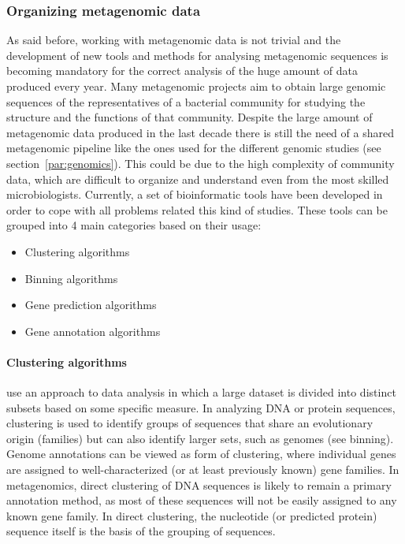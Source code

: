 \subsubsection*{Organizing metagenomic data}
As said before, working with metagenomic data is not trivial and the development of new tools and methods for analysing metagenomic sequences is becoming mandatory for the correct analysis of the huge amount of data produced every year. Many metagenomic projects aim to obtain large genomic sequences of the representatives of a bacterial community for studying the structure and the functions of that community. Despite the large amount of metagenomic data produced in the last decade there is still the need of a shared metagenomic pipeline like the ones used for the different genomic studies (see section~\ref{par:genomics}). This could be due to the high complexity of community data, which are difficult to organize and understand even from the most skilled microbiologists. Currently, a set of bioinformatic tools have been developed in order to cope with all problems related this kind of studies. These tools can be grouped into 4 main categories based on their usage:
\vspace{-3mm}
\begin{itemize}[nosep]
\item Clustering algorithms
\item Binning algorithms
\item Gene prediction algorithms
\item Gene annotation algorithms
\end{itemize}

\paragraph{Clustering algorithms} use an approach to data analysis in which a large dataset is divided into distinct subsets based on some specific measure. In analyzing DNA or protein sequences, clustering is used to identify groups of sequences that share an evolutionary origin (families) but can also identify larger sets, such as genomes (see binning). Genome annotations can be viewed as form of clustering, where individual genes are assigned to well-characterized (or at least previously known) gene families. In metagenomics, direct clustering of DNA sequences is likely to remain a primary annotation method, as most of these sequences will not be easily assigned to any known gene family. In direct clustering, the nucleotide (or predicted protein) sequence itself is the basis of the grouping of sequences.\\

